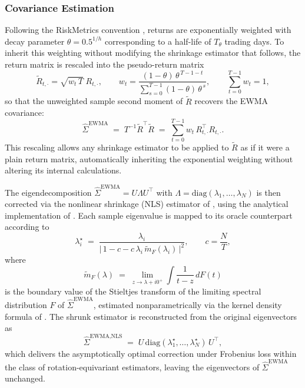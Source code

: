 \documentclass[12pt]{article}
\begin{document}
\subsubsection{Covariance Estimation}
Following the RiskMetrics convention \cite{riskmetrics1996}, returns are exponentially weighted with decay parameter $\theta = 0.5^{1/h}$ corresponding to a half-life of $T_\theta$ trading days. To inherit this weighting without modifying the shrinkage estimator that follows, the return matrix is rescaled into the pseudo-return matrix
\begin{equation}
  \tilde{R}_{t,\cdot} = \sqrt{w_t \, T}\; R_{t,\cdot}, \qquad
  w_t = \frac{(1-\theta)\,\theta^{\,T-1-t}}{\sum_{s=0}^{T-1}(1-\theta)\,\theta^{\,s}}, \qquad \sum_{t=0}^{T-1} w_t = 1,
  \label{eq:ewma-pseudo}
\end{equation}
so that the unweighted sample second moment of $\tilde{R}$ recovers the EWMA covariance:
\begin{equation}
  \hat{\Sigma}^{\text{EWMA}} \;=\; T^{-1}\tilde{R}^{\top}\tilde{R} \;=\; \sum_{t=0}^{T-1} w_t\, R_{t,\cdot}^{\top} R_{t,\cdot}.
  \label{eq:ewma-cov}
\end{equation}
This rescaling allows any shrinkage estimator to be applied to $\tilde{R}$ as if it were a plain return matrix, automatically inheriting the exponential weighting without altering its internal calculations.

The eigendecomposition $\hat{\Sigma}^{\text{EWMA}} = U\Lambda U^{\top}$ with $\Lambda = \mathrm{diag}(\lambda_1,\dots,\lambda_N)$ is then corrected via the nonlinear shrinkage (NLS) estimator of \cite{ledoitwolf2012}, using the analytical implementation of \cite{ledoitwolf2020}. Each sample eigenvalue is mapped to its oracle counterpart according to
\begin{equation}
  \lambda_i^{\star} \;=\; \frac{\lambda_i}{\bigl|\,1 - c - c\, \lambda_i\, \tilde{m}_F(\lambda_i)\,\bigr|^{2}}, 
  \qquad c = \frac{N}{T},
  \label{eq:nls}
\end{equation}
where 
\begin{equation}
  \tilde{m}_F(\lambda) \;=\; \lim_{z \to \lambda + i 0^{+}} \int \frac{1}{t - z}\, dF(t)
  \label{eq:stieltjes}
\end{equation}
is the boundary value of the Stieltjes transform of the limiting spectral distribution $F$ of $\hat{\Sigma}^{\text{EWMA}}$, estimated nonparametrically via the kernel density formula of \cite{ledoitwolf2020}. The shrunk estimator is reconstructed from the original eigenvectors as
\begin{equation}
  \hat{\Sigma}^{\text{EWMA,NLS}} \;=\; U\,\mathrm{diag}(\lambda_1^{\star},\dots,\lambda_N^{\star})\,U^{\top},
  \label{eq:nls-cov}
\end{equation}
which delivers the asymptotically optimal correction under Frobenius loss within the class of rotation-equivariant estimators, leaving the eigenvectors of $\hat{\Sigma}^{\text{EWMA}}$ unchanged.
\end{document}
